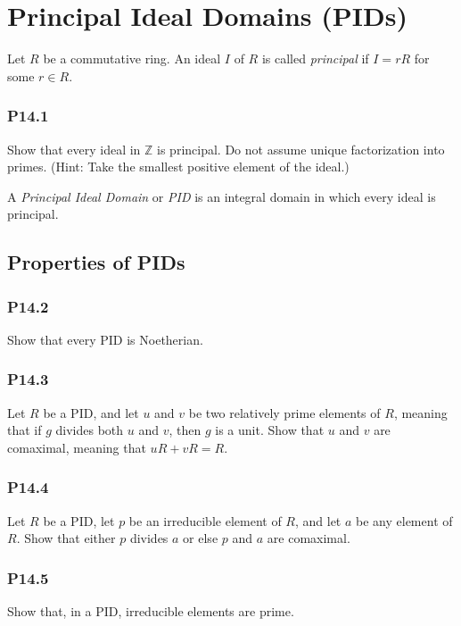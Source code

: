 \documentclass[lang=cn,11pt]{template}
\begin{document}
\chapter{Principal Ideal Domains (PIDs)}

\begin{definition}
Let \( R \) be a commutative ring. An ideal \( I \) of \( R \) is called \textit{principal} if \( I = rR \) for some \( r \in R \).
\end{definition}

\subsection*{P14.1} Show that every ideal in \( \mathbb{Z} \) is principal. Do not assume unique factorization into primes. (Hint: Take the smallest positive element of the ideal.)

\begin{definition}
A \textit{Principal Ideal Domain} or \textit{PID} is an integral domain in which every ideal is principal.
\end{definition}

\section{Properties of PIDs}

\subsection*{P14.2} Show that every PID is Noetherian.

\subsection*{P14.3} Let \( R \) be a PID, and let \( u \) and \( v \) be two relatively prime elements of \( R \), meaning that if \( g \) divides both \( u \) and \( v \), then \( g \) is a unit. Show that \( u \) and \( v \) are comaximal, meaning that \( uR + vR = R \).

\subsection*{P14.4} Let \( R \) be a PID, let \( p \) be an irreducible element of \( R \), and let \( a \) be any element of \( R \). Show that either \( p \) divides \( a \) or else \( p \) and \( a \) are comaximal.

\subsection*{P14.5} Show that, in a PID, irreducible elements are prime.
\end{document}
